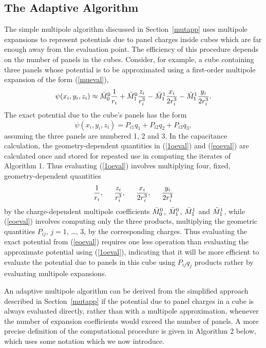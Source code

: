 \subsection{The Adaptive Algorithm}

The simple multipole algorithm discussed in Section~\ref{mutapp}
uses multipole expansions to represent potentials due to
panel charges inside cubes which
are far enough away from the evaluation point.
The efficiency of this procedure depends on the number of panels in the cubes. 
Consider, for example, a cube containing three panels whose
potential is to be approximated using a first-order multipole
expansion of the form (\ref{mueval}),
\begin{equation}
\psi(x_i,y_i,z_i)\approx\mbox{$\bar{M}_{0}^{0}$}\frac{1}{r_i}+\mbox{$\bar{M}_{1}^{0}$}\frac{z_i}{r_i^3}-\mbox{$\bar{M}_{1}^{1}$}\frac{x_i}{2r_i^3}-\mbox{$\tilde{M}_{1}^{1}$}\frac{y_i}{2r_i^3}.
\label{1oeval}
\end{equation}
The exact potential due to the cube's panels has the form
\begin{equation}
\psi(x_i,y_i,z_i)=P_{i1}q_1+P_{i2}q_2+P_{i3}q_3,
\label{eoeval}
\end{equation}
assuming the three panels are numbered 1, 2 and 3. 
In the capacitance
calculation, the geometry-dependent quantities in (\ref{1oeval}) 
and (\ref{eoeval}) are calculated once and stored for repeated
use in computing the iterates of Algorithm 1.  Thus evaluating
(\ref{1oeval}) involves multiplying four, fixed, geometry-dependent quantities
\begin{equation}
\frac{1}{r_i},\rule{0.2in}{0in}\frac{z_i}{r_i^3},\rule{0.2in}{0in}\frac{x_i}{2r_i^3},\rule{0.2in}{0in}\frac{y_i}{2r_i^3}
\end{equation}
by the charge-dependent multipole coefficients $\mbox{$\bar{M}_{0}^{0}$}$,
$\mbox{$\bar{M}_{1}^{0}$}$, $\mbox{$\bar{M}_{1}^{1}$}$ and $\mbox{$\tilde{M}_{1}^{1}$}$, while (\ref{eoeval})
involves computing only the three products, multiplying the geometric
quantities $P_{ij}$, $j=1$, \ldots, $3$, by the corresponding
charges. Thus evaluating the exact potential from (\ref{eoeval}) requires
one less operation than evaluating the approximate potential using
(\ref{1oeval}), indicating that it will be more efficient to evaluate
the potential due to panels in this cube using $P_{ij}q_j$ products
rather by evaluating multipole expansions.

An adaptive multipole algorithm can be derived from the simplified
approach described in Section~\ref{mutapp} if the potential due to
panel charges in a cube is always evaluated directly, rather than
with a multipole approximation, whenever the number of expansion
coefficients would exceed the number of panels.  A more precise
definition of the computational procedure is given in Algorithm 2
below, which uses some notation which we now introduce.

